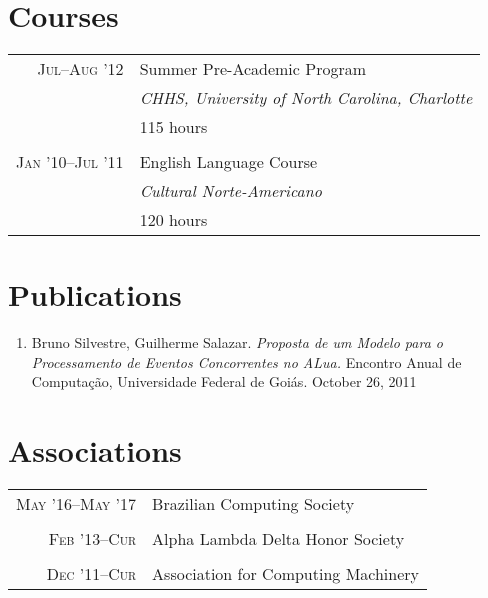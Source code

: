 \documentclass[a4paper,10pt]{article}
\begin{document}
\section{Courses}

\begin{tabular}{r|p{11cm}}

  \textsc{Jul--Aug '12} & Summer Pre-Academic Program\\ &
  \emph{CHHS, University of North Carolina, Charlotte}\\ & 115 hours
  \\\multicolumn{2}{c}{} \\

  \textsc{Jan '10--Jul '11} & English Language Course\\ &
  \emph{Cultural Norte-Americano} \\ & 120 hours\\

\end{tabular}

\section{Publications}
\begin{enumerate}
  \renewcommand{\labelenumi}{[\arabic{enumi}] }
  \item Bruno Silvestre, Guilherme Salazar. \emph{Proposta de um Modelo para o
        Processamento de Eventos Concorrentes no ALua.} Encontro Anual de
        Computação, Universidade Federal de Goiás. October 26, 2011
\end{enumerate}

\section{Associations}

\begin{tabular}{r|p{11cm}}

  \textsc{May '16--May '17}
  & Brazilian Computing Society\\
  \multicolumn{2}{c}{}\\

  \textsc{Feb '13--Cur}
  & Alpha Lambda Delta Honor Society\\
  \multicolumn{2}{c}{}\\

  \textsc{Dec '11--Cur}
  & Association for Computing Machinery\\

\end{tabular}
\end{document}
